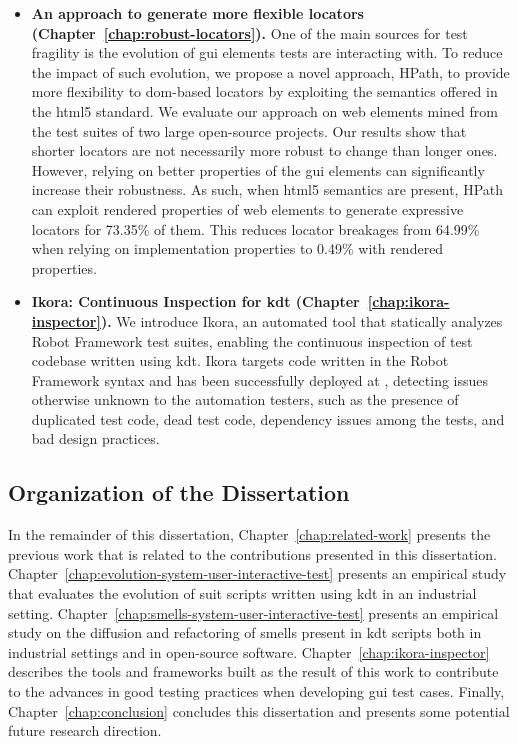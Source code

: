 \begin{itemize}
    \item \textbf{An approach to generate more flexible locators (Chapter~\ref{chap:robust-locators}).} One of the main sources for test fragility is the evolution of \gls{gui} elements tests are interacting with. To reduce the impact of such evolution, we propose a novel approach, HPath, to provide more flexibility to \gls{dom}-based locators by exploiting the semantics offered in the \gls{html}5 standard. We evaluate our approach on web elements mined from the test suites of two large open-source projects. Our results show that shorter locators are not necessarily more robust to change than longer ones. However, relying on better properties of the \gls{gui} elements can significantly increase their robustness. As such, when \gls{html}5 semantics are present, HPath can exploit rendered properties of web elements to generate expressive locators for 73.35\% of them. This reduces locator breakages from 64.99\% when relying on implementation properties to 0.49\% with rendered properties.
    
    \item \textbf{Ikora: Continuous Inspection for \gls{kdt} (Chapter~\ref{chap:ikora-inspector}).} We introduce Ikora, an automated tool that statically analyzes Robot Framework test suites, enabling the continuous inspection of test codebase written using \gls{kdt}. Ikora targets code written in the Robot Framework syntax and has been successfully deployed at \BGL, detecting issues otherwise unknown to the automation testers, such as the presence of duplicated test code, dead test code, dependency issues among the tests, and bad design practices.
\end{itemize}

\subsection{Organization of the Dissertation}

In the remainder of this dissertation, Chapter~\ref{chap:related-work} presents the previous work that is related to the contributions presented in this dissertation. Chapter~\ref{chap:evolution-system-user-interactive-test} presents an empirical study that evaluates the evolution of \gls{suit} scripts written using \gls{kdt} in an industrial setting. Chapter~\ref{chap:smells-system-user-interactive-test} presents an empirical study on the diffusion and refactoring of smells present in \gls{kdt} scripts both in industrial settings and in open-source software. Chapter~\ref{chap:ikora-inspector} describes the tools and frameworks built as the result of this work to contribute to the advances in good testing practices when developing \gls{gui} test cases. Finally, Chapter~\ref{chap:conclusion} concludes this dissertation and presents some potential future research direction.
